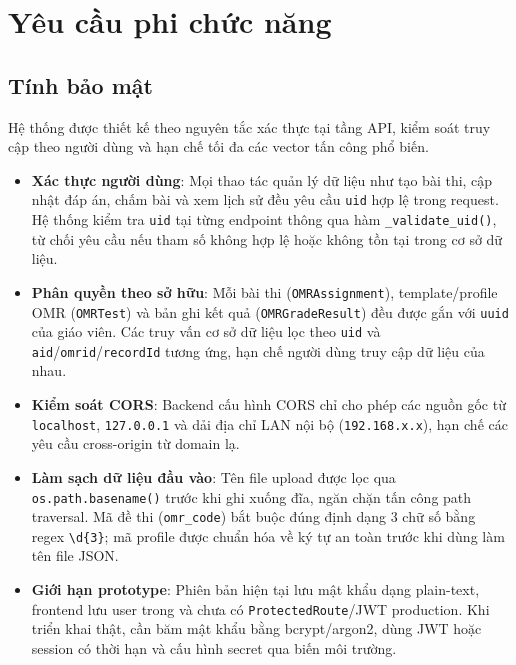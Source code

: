 \normalsize
\setlength{\tabcolsep}{4pt}
\renewcommand{\arraystretch}{1.18}

\section{Yêu cầu phi chức năng}
\subsection{Tính bảo mật}
Hệ thống được thiết kế theo nguyên tắc xác thực tại tầng API, kiểm soát truy cập theo người dùng và hạn chế tối đa các vector tấn công phổ biến.

\begin{itemize}[leftmargin=1.5cm]
  \item \textbf{Xác thực người dùng}: Mọi thao tác quản lý dữ liệu như tạo bài thi, cập nhật đáp án, chấm bài và xem lịch sử đều yêu cầu \texttt{uid} hợp lệ trong request. Hệ thống kiểm tra \texttt{uid} tại từng endpoint thông qua hàm \texttt{\_validate\_uid()}, từ chối yêu cầu nếu tham số không hợp lệ hoặc không tồn tại trong cơ sở dữ liệu.
  \item \textbf{Phân quyền theo sở hữu}: Mỗi bài thi (\texttt{OMRAssignment}), template/profile OMR (\texttt{OMRTest}) và bản ghi kết quả (\texttt{OMRGradeResult}) đều được gắn với \texttt{uuid} của giáo viên. Các truy vấn cơ sở dữ liệu lọc theo \texttt{uid} và \texttt{aid}/\texttt{omrid}/\texttt{recordId} tương ứng, hạn chế người dùng truy cập dữ liệu của nhau.
  \item \textbf{Kiểm soát CORS}: Backend cấu hình CORS chỉ cho phép các nguồn gốc từ \texttt{localhost}, \texttt{127.0.0.1} và dải địa chỉ LAN nội bộ (\texttt{192.168.x.x}), hạn chế các yêu cầu cross-origin từ domain lạ.
  \item \textbf{Làm sạch dữ liệu đầu vào}: Tên file upload được lọc qua \texttt{os.path.basename()} trước khi ghi xuống đĩa, ngăn chặn tấn công path traversal. Mã đề thi (\texttt{omr\_code}) bắt buộc đúng định dạng 3 chữ số bằng regex \texttt{\textbackslash d\{3\}}; mã profile được chuẩn hóa về ký tự an toàn trước khi dùng làm tên file JSON.
  \item \textbf{Giới hạn prototype}: Phiên bản hiện tại lưu mật khẩu dạng plain-text, frontend lưu user trong  và chưa có \texttt{ProtectedRoute}/JWT production. Khi triển khai thật, cần băm mật khẩu bằng bcrypt/argon2, dùng JWT hoặc session có thời hạn và cấu hình secret qua biến môi trường.
\end{itemize}

